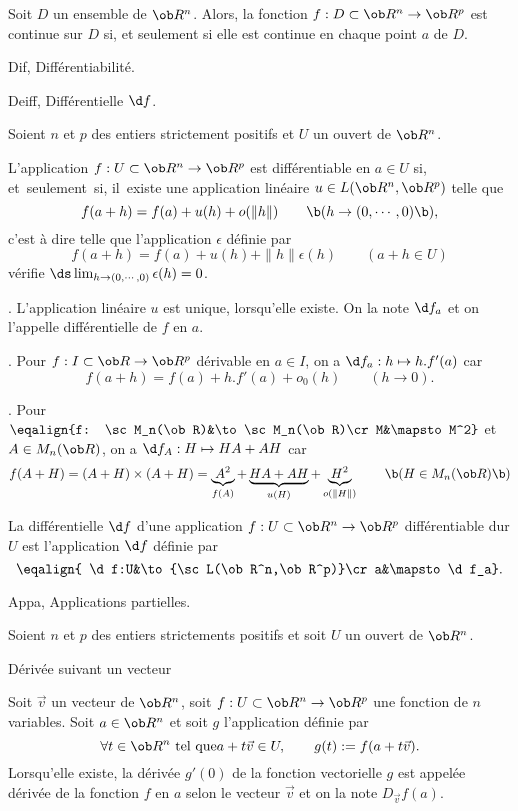 \Definition []  Soit $D$ un ensemble de $\ob R^n$. Alors, la fonction $f:D\subset\ob R^n\to\ob R^p$ est continue sur $D$ si, et seulement si elle est continue en chaque point $a$ de $D$. 
\bigskip


\Section Dif, Diff\'erentiabilit\'e.
\bigskip

\Subsection Deiff, Diff\'erentielle $\d f$. 

\noindent
Soient $n$ et $p$ des entiers strictement positifs et $U$ un ouvert de $\ob R^n$. 
\bigskip

\Definition []  L'application $f:U\subset \ob R^n\to\ob R^p$ 
est diff\'erentiable en $a\in U$ si, et~seulement~si, il~existe 
une application lin\'eaire $u\in\sc L(\ob R^n,\ob R^p)$ telle que 
$$
f(a+h)=f(a)+u(h)+o(\|h\|)\qquad\b(h\to(0,\cdots,0)\b), 
$$
c'est \`a dire telle que l'application $\epsilon$ d\'efinie par 
$$
f(a+h)=f(a)+u(h)+\|h\|\epsilon(h)\qquad(a+h\in U)
$$ 
v\'erifie $\ds\lim_{h\to (0,\cdots,0)}\epsilon(h)=0$. 
\bigskip

\Remarque. L'application lin\'eaire $u$ est unique, lorsqu'elle existe. 
On la note $\d f_a$ et 
on l'appelle diff\'erentielle de $f$ en $a$. 
\bigskip

\Exemple. Pour $f:I\subset \ob R\to\ob R^p$ d\'erivable en $a\in I$, on a $\d f_a:h\mapsto h.f'(a)$ car 
$$
f(a+h)=f(a)+h.f'(a)+o_0(h)\qquad(h\to 0). 
$$
\smallskip

\Exemple. Pour $\eqalign{f: \sc M_n(\ob R)&\to\sc M_n(\ob R)\cr M&\mapsto  M^2}$ et $A\in\sc M_n(\ob R)$, 
on a $\d f_A:H\mapsto HA+AH$ car 
$$
f(A+H)=(A+H)\times(A+H)=\underbrace{A^2}_{f(A)}+\underbrace{HA+AH}_{u(H)}
+\underbrace{H^2}_{o(\|H\|)}\qquad\b(H\in\sc M_n(\ob R)\b)
$$

\Definition []  La diff\'erentielle $\d f$ d'une application $f:U\subset\ob R^n\to\ob R^p$ diff\'erentiable dur $U$ est l'application $\d f$ d\'efinie par 
$$
\eqalign{ \d f:U&\to{\sc L(\ob R^n,\ob R^p)}\cr  a&\mapsto  \d f_a}.
$$

\Subsection Appa, Applications partielles. 

\noindent 
Soient $n$ et $p$ des entiers strictements positifs et soit $U$ un ouvert de $\ob R^n$. 
\bigskip

\Concept [] D\'eriv\'ee suivant un vecteur

\Definition []  Soit $\vec v$ un vecteur de $\ob R^n$, soit $f:U\subset \ob R^n\to\ob R^p$ une fonction de $n$ variables. Soit $a\in\ob R^n$ et soit $g$ l'application d\'efinie par 
$$
\forall t\in\ob R^n\mbox{ tel que}a+t\vec v\in U, \qquad g(t):=f(a+t\vec v).
$$
Lorsqu'elle existe, la d\'eriv\'ee $g'(0)$ de la fonction vectorielle $g$ est appel\'ee d\'eriv\'ee de la fonction $f$ en $a$ selon le vecteur $\vec v$ et 
on la note $D_{\vec v}f(a)$. 
\bigskip 

